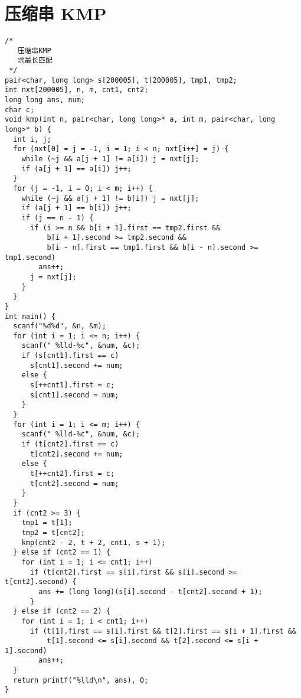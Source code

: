 \section{压缩串 KMP}
\begin{lstlisting}
/*
   压缩串KMP
   求最长匹配
 */
pair<char, long long> s[200005], t[200005], tmp1, tmp2;
int nxt[200005], n, m, cnt1, cnt2;
long long ans, num;
char c;
void kmp(int n, pair<char, long long>* a, int m, pair<char, long long>* b) {
  int i, j;
  for (nxt[0] = j = -1, i = 1; i < n; nxt[i++] = j) {
    while (~j && a[j + 1] != a[i]) j = nxt[j];
    if (a[j + 1] == a[i]) j++;
  }
  for (j = -1, i = 0; i < m; i++) {
    while (~j && a[j + 1] != b[i]) j = nxt[j];
    if (a[j + 1] == b[i]) j++;
    if (j == n - 1) {
      if (i >= n && b[i + 1].first == tmp2.first &&
          b[i + 1].second >= tmp2.second &&
          b[i - n].first == tmp1.first && b[i - n].second >= tmp1.second)
        ans++;
      j = nxt[j];
    }
  }
}
int main() {
  scanf("%d%d", &n, &m);
  for (int i = 1; i <= n; i++) {
    scanf(" %lld-%c", &num, &c);
    if (s[cnt1].first == c)
      s[cnt1].second += num;
    else {
      s[++cnt1].first = c;
      s[cnt1].second = num;
    }
  }
  for (int i = 1; i <= m; i++) {
    scanf(" %lld-%c", &num, &c);
    if (t[cnt2].first == c)
      t[cnt2].second += num;
    else {
      t[++cnt2].first = c;
      t[cnt2].second = num;
    }
  }
  if (cnt2 >= 3) {
    tmp1 = t[1];
    tmp2 = t[cnt2];
    kmp(cnt2 - 2, t + 2, cnt1, s + 1);
  } else if (cnt2 == 1) {
    for (int i = 1; i <= cnt1; i++)
      if (t[cnt2].first == s[i].first && s[i].second >= t[cnt2].second) {
        ans += (long long)(s[i].second - t[cnt2].second + 1);
      }
  } else if (cnt2 == 2) {
    for (int i = 1; i < cnt1; i++)
      if (t[1].first == s[i].first && t[2].first == s[i + 1].first &&
          t[1].second <= s[i].second && t[2].second <= s[i + 1].second)
        ans++;
  }
  return printf("%lld\n", ans), 0;
}
\end{lstlisting}
